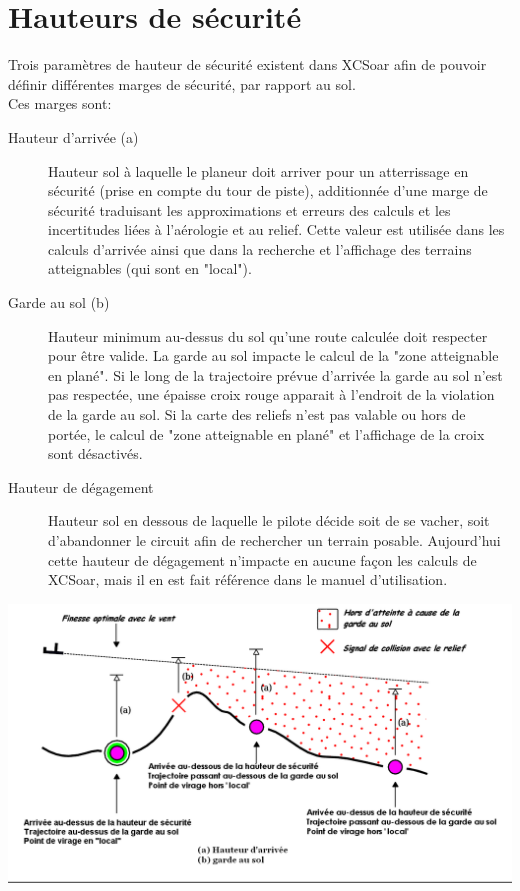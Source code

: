 \section{Hauteurs de sécurité}\label{sec:safety-heights}
Trois paramètres de hauteur de sécurité existent dans XCSoar afin de pouvoir définir différentes marges de sécurité, par rapport au sol.
\\
Ces marges sont:
\begin{description}
\item[Hauteur d'arrivée (a)]  Hauteur sol à laquelle le planeur doit arriver pour un atterrissage en sécurité (prise en compte du tour de piste), additionnée d'une marge de sécurité traduisant les  approximations et erreurs des calculs et les incertitudes liées à l'aérologie et au relief. Cette valeur est utilisée dans les calculs d'arrivée ainsi que dans la recherche et l'affichage des terrains atteignables (qui sont en "local").
\item[Garde au sol (b)] Hauteur minimum au-dessus du sol qu'une route calculée doit respecter pour être valide. La garde au sol impacte le calcul de la "zone atteignable en plané". Si le long de la trajectoire prévue d'arrivée la garde au sol n'est pas respectée, une épaisse croix rouge apparait à l'endroit de la violation de la garde au sol. Si la carte des reliefs n'est pas valable ou hors de portée, le calcul de "zone atteignable en plané" et l'affichage de la croix sont désactivés.
\item[Hauteur de dégagement]  Hauteur sol en dessous de laquelle le pilote décide soit de se vacher, soit d'abandonner le circuit afin de rechercher un terrain posable. Aujourd'hui cette hauteur de dégagement n'impacte en aucune façon les calculs de XCSoar, mais il en est fait référence dans le manuel d'utilisation.
\end{description}

\begin{center}
\includegraphics[angle=0,width=\linewidth,keepaspectratio='true']{figures/figure_terrain.png}
\end{center}

